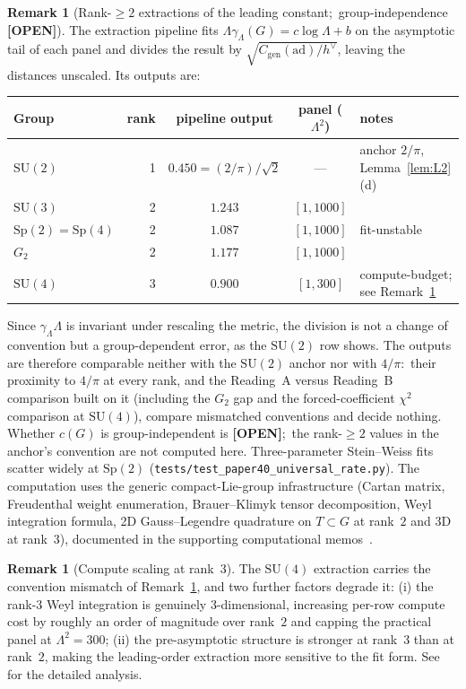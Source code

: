 \documentclass[11pt,a4paper]{article}
\theoremstyle{plain}
\theoremstyle{definition}
\newtheorem{remark}[theorem]{Remark}
\newcommand{\Lammax}{\Lambda}
\newcommand{\SU}{\mathrm{SU}}
\newcommand{\Sp}{\mathrm{Sp}}
\begin{document}
\begin{remark}[Rank-$\ge 2$ extractions of the leading constant;\
group-independence \textbf{[OPEN]}]\label{thm:universal_constant}
The extraction pipeline fits $\Lammax \gamma_\Lammax(G) = c \log\Lammax + b$
on the asymptotic tail of each panel and divides the result by
$\sqrt{C_{\mathrm{gen}}(\mathrm{ad})/h^\vee}$, leaving the distances
unscaled. Its outputs are:
\begin{center}
\begin{tabular}{lrccl}
\toprule
Group & rank & pipeline output & panel ($\Lammax^2$) & notes \\
\midrule
$\SU(2)$ & 1 & $0.450 = (2/\pi)/\sqrt2$ & --- &
anchor $2/\pi$, Lemma~\ref{lem:L2}(d) \\
$\SU(3)$ & 2 & $1.243$ & $[1, 1000]$ & \\
$\Sp(2) = \Sp(4)$ & 2 & $1.087$ & $[1, 1000]$ & fit-unstable \\
$G_2$ & 2 & $1.177$ & $[1, 1000]$ & \\
$\SU(4)$ & 3 & $0.900$ & $[1, 300]$ &
compute-budget; see Remark~\ref{rem:su4_compute} \\
\bottomrule
\end{tabular}
\end{center}
Since $\gamma_\Lammax\Lammax$ is invariant under rescaling the metric,
the division is not a change of convention but a group-dependent
error, as the $\SU(2)$ row shows. The outputs are therefore comparable
neither with the $\SU(2)$ anchor nor with $4/\pi$:\ their proximity to
$4/\pi$ at every rank, and the Reading~A versus Reading~B comparison
built on it (including the $G_2$ gap and the forced-coefficient
$\chi^2$ comparison at $\SU(4)$), compare mismatched conventions and
decide nothing. Whether $c(G)$ is group-independent is
\textbf{[OPEN]};\ the rank-$\ge 2$ values in the anchor's convention are
not computed here. Three-parameter Stein--Weiss fits scatter widely at
$\Sp(2)$ (\texttt{tests/test\_paper40\_universal\_rate.py}). The
computation uses the generic compact-Lie-group infrastructure (Cartan
matrix, Freudenthal weight enumeration, Brauer--Klimyk tensor
decomposition, Weyl integration formula, 2D Gauss--Legendre quadrature
on $T \subset G$ at rank~$2$ and 3D at rank~$3$), documented in the
supporting computational memos~\cite{sp2_g2_rate_memo, su4_rate_memo}.
\end{remark}

\begin{remark}[Compute scaling at rank~$3$]\label{rem:su4_compute}
The $\SU(4)$ extraction carries the convention mismatch of
Remark~\ref{thm:universal_constant}, and two further factors degrade it: (i) the rank-$3$ Weyl integration
is genuinely $3$-dimensional, increasing per-row compute cost by
roughly an order of magnitude over rank~$2$ and capping the practical
panel at $\Lammax^2 = 300$; (ii) the pre-asymptotic structure is
stronger at rank~$3$ than at rank~$2$, making the leading-order
extraction more sensitive to the fit form. See~\cite{su4_rate_memo} for the detailed analysis.
\end{remark}
\end{document}
